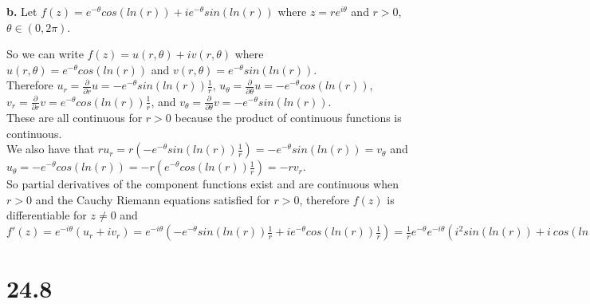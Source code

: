 \documentclass{article}
\begin{document}
{\Large\textbf{b.}} Let $f(z) = e^{-\theta} cos(ln(r)) + i e^{-\theta} sin(ln(r))$ where $z = r e^{i\theta}$ and $r > 0$, $\theta\in (0, 2\pi)$.
\begin{center}
    \doublespacing
    So we can write $f(z) = u(r,\theta) + iv(r,\theta)$ where $u(r,\theta) = e^{-\theta} cos(ln(r))$ and $v(r,\theta) = e^{-\theta} sin(ln(r))$.
    \break
    \\Therefore $u_r =\frac{\partial}{\partial r} u = -e^{-\theta} sin(ln(r))\frac{1}{r}$, $u_\theta =\frac{\partial}{\partial\theta} u = -e^{-\theta} cos(ln(r))$, $v_r =\frac{\partial}{\partial r} v = e^{-\theta} cos(ln(r))\frac{1}{r}$, and $v_\theta =\frac{\partial}{\partial\theta} v = -e^{-\theta} sin(ln(r))$.
    \\These are all continuous for $r > 0$ because the product of continuous functions is continuous.
    \\We also have that $r u_r = r(-e^{-\theta} sin(ln(r))\frac{1}{r}) = -e^{-\theta} sin(ln(r)) = v_\theta$ and $u_\theta = -e^{-\theta} cos(ln(r)) = -r (e^{-\theta} cos(ln(r))\frac{1}{r}) = -r v_r$.
    \break
    \\So partial derivatives of the component functions exist and are continuous when $r > 0$ and the Cauchy Riemann equations satisfied for $r > 0$, therefore $f(z)$ is differentiable for $z\neq 0$ and $f'(z) = e^{-i\theta} (u_r + iv_r) = e^{-i\theta} (-e^{-\theta} sin(ln(r))\frac{1}{r} + i e^{-\theta} cos(ln(r))\frac{1}{r}) =\frac{1}{r} e^{-\theta} e^{-i\theta} (i^2 sin(ln(r)) + i\:cos(ln(r))) =\frac{i}{r e^{i\theta}} e^{-\theta} (i\:sin(ln(r)) + cos(ln(r))) =\frac{i}{r e^{i\theta}} (e^{-\theta} cos(ln(r)) + ie^{-\theta} sin(ln(r))) =\frac{i f(z)}{z}$ \qedsymbol
\end{center}


\newpage
\section*{24.8}
\end{document}
